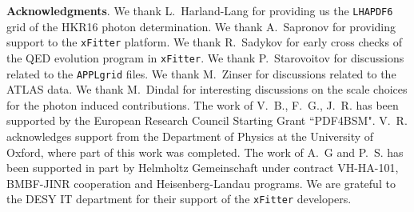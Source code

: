 {\bf Acknowledgments}.
%
We thank L.~Harland-Lang for providing us the {\tt LHAPDF6} grid of
the HKR16 photon determination.
%
We thank A.~Sapronov for providing support to the {\tt xFitter} platform.
%
We thank R.~Sadykov for early cross checks of the QED evolution program in {\tt xFitter}.
%
We thank P.~Starovoitov for discussions related to the {\tt APPLgrid} files.
%
We thank M.~Zinser for discussions related to the ATLAS data.
% 
We thank M.~Dindal for interesting discussions on the scale choices for the photon induced contributions.
%
The work of V.~B., F.~G., J.~R. has been supported by the European
Research Council Starting Grant ``PDF4BSM".
%
V.~R. acknowledges support from the Department of Physics at the University of
Oxford, where part of this work was completed.
%
The work of A.~G and P.~S. has been supported in part by Helmholtz Gemeinschaft
under contract VH-HA-101, BMBF-JINR cooperation and Heisenberg-Landau programs.
%
We are grateful to the DESY IT department for their support of the {\tt xFitter} developers. 



